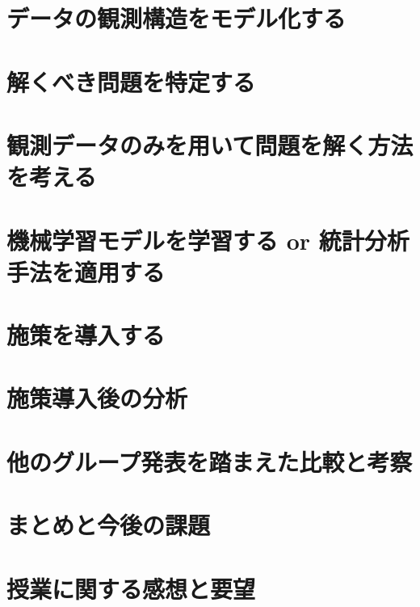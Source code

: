 \documentclass[titlepage,a4paper]{jsarticle}
\title{}
\author{本間 三暉}
\begin{document}
\maketitle
\section{データの観測構造をモデル化する}
\section{解くべき問題を特定する}

\section{観測データのみを用いて問題を解く方法を考える}
\section{機械学習モデルを学習する or 統計分析手法を適用する}
\section{施策を導入する}
\section{施策導入後の分析}
\section{他のグループ発表を踏まえた比較と考察}
\section{まとめと今後の課題}
\section{授業に関する感想と要望}
\begin{thebibliography}{99}
  \bibitem{}
\end{thebibliography}
\end{document}

